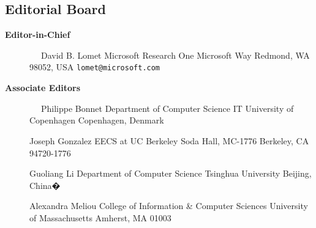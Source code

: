 \documentclass[10pt,twocolumn]{article}
\begin{document}
\pagestyle{empty}

\subsection*{Editorial Board}

\begin{description}
\item[{\bf Editor-in-Chief}]
\verb-  -                      \newline
David B. Lomet                 \newline
Microsoft Research             \newline
One Microsoft Way     \newline
Redmond, WA 98052, USA         \newline
\verb+lomet@microsoft.com+     
\vspace{-.2cm}

\item[{\bf Associate Editors}] 
\verb-  -                     \newline
Philippe Bonnet \newline
Department of Computer Science \newline
IT University of Copenhagen  Copenhagen, Denmark \newline

\vspace{-.4cm}

Joseph Gonzalez \newline
EECS at UC Berkeley Soda Hall, MC-1776 \newline
Berkeley, CA 94720-1776 \newline

\vspace{-.4cm}

Guoliang Li\newline
Department of Computer Science \newline 
Tsinghua University\newline
Beijing, China�\newline
\vspace{-.2cm}

Alexandra Meliou\newline
College of Information \& Computer Sciences \newline 
University of  Massachusetts \newline
Amherst, MA 01003 \newline
\vspace{-.2cm}



\end{description}
\end{document}

